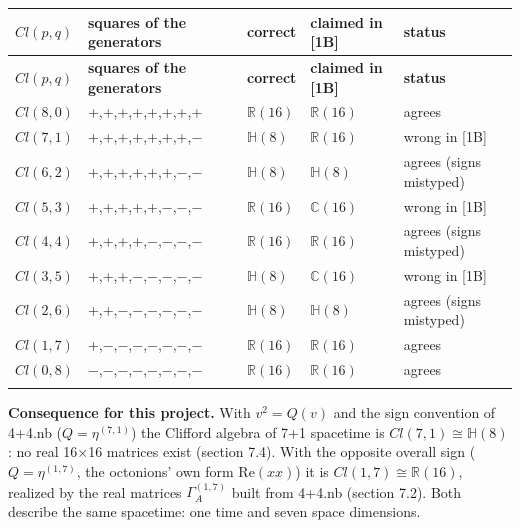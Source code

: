 \documentclass[10pt,a4paper]{article}
\begin{document}
{\small
\begin{longtable}{>{\raggedright\arraybackslash}p{}>{\raggedright\arraybackslash}p{}>{\raggedright\arraybackslash}p{}>{\raggedright\arraybackslash}p{}>{\raggedright\arraybackslash}p{}}
\toprule
\textbf{$Cl(p,q)$} & \textbf{squares of the generators} & \textbf{correct} & \textbf{claimed in [1B]} & \textbf{status} \\
\midrule\endfirsthead
\toprule
\textbf{$Cl(p,q)$} & \textbf{squares of the generators} & \textbf{correct} & \textbf{claimed in [1B]} & \textbf{status} \\
\midrule\endhead
\endfoot
\bottomrule\endlastfoot
$Cl(8,0)$ & +,+,+,+,+,+,+,+ & $\mathbb R(16)$ & $\mathbb R(16)$ & agrees \\
$Cl(7,1)$ & +,+,+,+,+,+,+,− & $\mathbb H(8)$ & $\mathbb R(16)$ & wrong in [1B] \\
$Cl(6,2)$ & +,+,+,+,+,+,−,− & $\mathbb H(8)$ & $\mathbb H(8)$ & agrees (signs mistyped) \\
$Cl(5,3)$ & +,+,+,+,+,−,−,− & $\mathbb R(16)$ & $\mathbb C(16)$ & wrong in [1B] \\
$Cl(4,4)$ & +,+,+,+,−,−,−,− & $\mathbb R(16)$ & $\mathbb R(16)$ & agrees (signs mistyped) \\
$Cl(3,5)$ & +,+,+,−,−,−,−,− & $\mathbb H(8)$ & $\mathbb C(16)$ & wrong in [1B] \\
$Cl(2,6)$ & +,+,−,−,−,−,−,− & $\mathbb H(8)$ & $\mathbb H(8)$ & agrees (signs mistyped) \\
$Cl(1,7)$ & +,−,−,−,−,−,−,− & $\mathbb R(16)$ & $\mathbb R(16)$ & agrees \\
$Cl(0,8)$ & −,−,−,−,−,−,−,− & $\mathbb R(16)$ & $\mathbb R(16)$ & agrees \\*
\end{longtable}}
\textbf{Consequence for this project.} With $v^2=Q(v)$ and the sign convention of 4+4.nb ($Q=\eta^{(7,1)}$) the Clifford algebra of 7+1 spacetime is $Cl(7,1)\cong\mathbb H(8)$: no real 16×16 matrices exist (section 7.4). With the opposite overall sign ($Q=\eta^{(1,7)}$, the octonions' own form $\mathrm{Re}(xx)$) it is $Cl(1,7)\cong\mathbb R(16)$, realized by the real matrices $\Gamma^{(1,7)}_A$ built from 4+4.nb (section 7.2). Both describe the same spacetime: one time and seven space dimensions.
\end{document}
